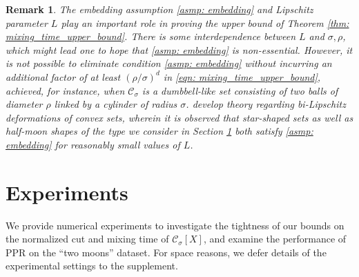 \documentclass{article}
\newcommand{\1}{\mathbf{1}}
\newcommand{\Xbf}{X}             %
\newcommand{\Cset}{\mathcal{C}}
\newcommand{\Csig}{\Cset_{\sigma}}
\theoremstyle{aldenthm}
\theoremstyle{aldenrmrk}
\newtheorem{remark}{Remark}
\begin{document}
\begin{remark}
  The embedding assumption \ref{asmp: embedding} and Lipschitz parameter $L$
  play an important role in proving the upper bound of Theorem \ref{thm:
    mixing_time_upper_bound}. There is some interdependence between $L$ and
  $\sigma,\rho$, which might lead one to hope that \ref{asmp: embedding} is
  non-essential. However, it is not possible to eliminate condition \ref{asmp:
    embedding} without incurring an additional factor of at least
  $(\rho/\sigma)^d$ in \eqref{eqn: mixing_time_upper_bound}, achieved, for
  instance, when $\Csig$ is a dumbbell-like set consisting of two balls of
  diameter $\rho$ linked by a cylinder of radius
  $\sigma$. \citet{abbasi-yadkori2016, abbasi-yadkori2016a}  
  develop theory regarding bi-Lipschitz deformations of convex sets, wherein it
  is observed that star-shaped sets as well as half-moon shapes of the type we
  consider in Section \ref{sec: experiments} both satisfy \ref{asmp: embedding}
  for reasonably small values of $L$. 
\end{remark}

\section{Experiments}
\label{sec: experiments}

We provide numerical experiments to investigate the tightness of our bounds on
the normalized cut and mixing time of $\Csig[\Xbf]$, and examine the performance
of PPR on the ``two moons'' dataset. For space reasons, we defer details of the
experimental settings to the supplement.  
\end{document}
